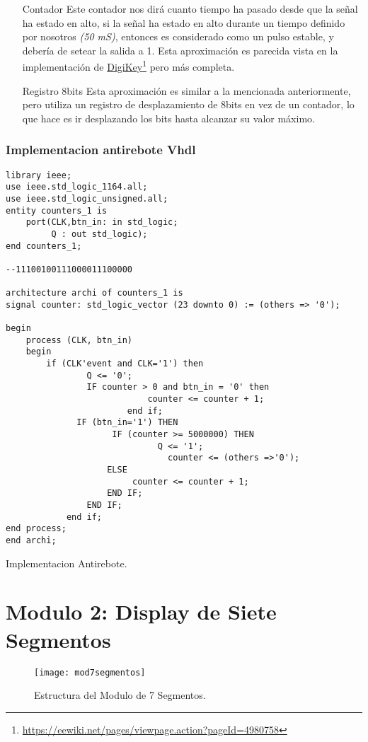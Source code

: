 \documentclass[a4paper]{article}
\newcommand\fnurl[2]{%
\href{#2}{#1}\footnote{\url{#2}}%
}
\begin{document}
\begin{itemize}
	\item[Contador] Este contador  nos dirá cuanto tiempo ha pasado desde que la señal ha estado en alto, si la señal  ha estado en alto durante un tiempo definido por nosotros \textit{(50 mS)}, entonces es considerado como un pulso estable, y debería de setear la salida a 1. Esta aproximación es parecida vista en la implementación de \fnurl{DigiKey}{https://eewiki.net/pages/viewpage.action?pageId=4980758} pero más completa.
    \item[Registro 8bits] Esta aproximación es similar a la mencionada anteriormente, pero utiliza un registro de desplazamiento de 8bits en vez de un contador, lo que hace es ir desplazando los bits hasta alcanzar su valor máximo.
\end{itemize}

\subsubsection{Implementacion antirebote Vhdl} \label{antirebote}
\begin{listing}[H]
	\begin{verbatim}
library ieee;
use ieee.std_logic_1164.all;
use ieee.std_logic_unsigned.all;
entity counters_1 is
    port(CLK,btn_in: in std_logic;
         Q : out std_logic);
end counters_1;

--11100100111000011100000

architecture archi of counters_1 is
signal counter: std_logic_vector (23 downto 0) := (others => '0');

begin
    process (CLK, btn_in)
    begin
        if (CLK'event and CLK='1') then
				Q <= '0';
				IF counter > 0 and btn_in = '0' then
							counter <= counter + 1;
						end if;
		      IF (btn_in='1') THEN
					 IF (counter >= 5000000) THEN
						      Q <= '1';
								counter <= (others =>'0');
				    ELSE
					     counter <= counter + 1;
				    END IF;
				END IF;
			end if;
end process;
end archi;
\end{verbatim}
\caption{Implementacion Antirebote.}
\end{listing}
			
                


\clearpage
\newpage
\section{Modulo 2: Display de Siete Segmentos \label{sieteseg}}
\begin{figure}[H]
  \centering
     \texttt{[image: mod7segmentos]}
  \caption{Estructura del Modulo de 7 Segmentos.}
    \label{fig:catodo}
\end{figure}
\end{document}
